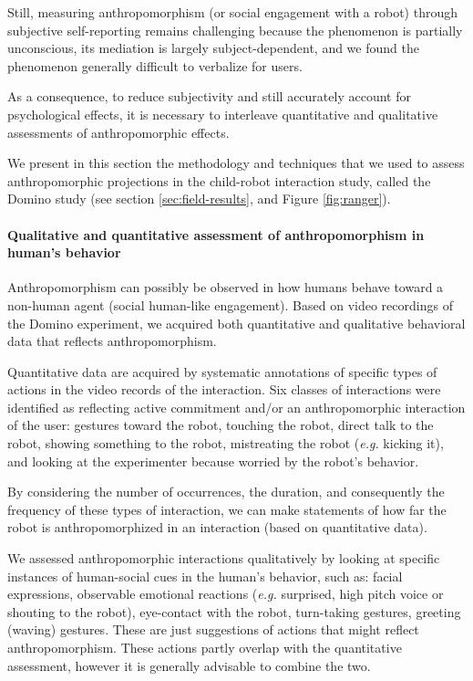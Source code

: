 \documentclass{frontiersSCNS} %
\newcommand{\eg}{\textit{e.g.}\xspace}
\begin{document}
Still, measuring anthropomorphism (or social engagement with a robot) through
subjective self-reporting remains challenging because the phenomenon is
partially unconscious, its mediation is largely subject-dependent, and we found
the phenomenon generally difficult to verbalize for users.

As a consequence, to reduce subjectivity and still accurately account for
psychological effects, it is necessary to interleave quantitative and
qualitative assessments of anthropomorphic effects.

We present in this section the methodology and techniques that we used to assess
anthropomorphic projections in the child-robot interaction study, called the
Domino study (see section \ref{sec:field-results}, and Figure \ref{fig:ranger}).

\paragraph{Qualitative and quantitative assessment of anthropomorphism in
human's behavior\\}

Anthropomorphism can possibly be observed in how humans behave toward a
non-human agent (social human-like engagement). Based on video recordings of the
Domino experiment, we acquired both quantitative and qualitative behavioral data
that reflects anthropomorphism.

Quantitative data are acquired by systematic annotations of specific types of
actions in the video records of the interaction. Six classes of interactions
were identified as reflecting active commitment and/or an anthropomorphic
interaction of the user: gestures toward the robot, touching the robot, direct
talk to the robot, showing something to the robot, mistreating the robot (\eg
kicking it), and looking at the experimenter because worried by the robot's
behavior.

By considering the number of occurrences, the duration, and consequently the
frequency of these types of interaction, we can make statements of how far the
robot is anthropomorphized in an interaction (based on quantitative data).

We assessed anthropomorphic interactions qualitatively by looking at specific
instances of human-social cues in the human's behavior, such as: facial
expressions, observable emotional reactions (\eg surprised, high pitch voice or
shouting to the robot), eye-contact with the robot, turn-taking gestures,
greeting (waving) gestures. These are just suggestions of actions that might
reflect anthropomorphism. These actions partly overlap with the quantitative
assessment, however it is generally advisable to combine the two.
\end{document}
